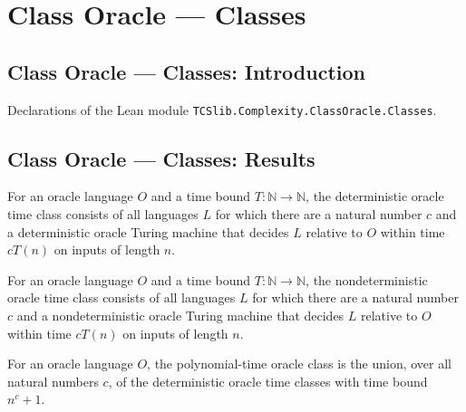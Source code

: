 \section{Class Oracle --- Classes}
\subsection*{Class Oracle --- Classes: Introduction}

Declarations of the Lean module \texttt{TCSlib.Complexity.ClassOracle.Classes}.

\subsection*{Class Oracle --- Classes: Results}

\begin{definition}
\label{Complexity.DTIMEOracle}
\leanok
{}
For an oracle language $O$ and a time bound $T\colon\mathbb{N}\to\mathbb{N}$, the
deterministic oracle time class consists of all languages $L$ for which there are a
natural number $c$ and a deterministic oracle Turing machine that decides $L$ relative
to $O$ within time $cT(n)$ on inputs of length $n$.
\end{definition}

\begin{definition}
\label{Complexity.NTIMEOracle}
\leanok
{}
For an oracle language $O$ and a time bound $T\colon\mathbb{N}\to\mathbb{N}$, the
nondeterministic oracle time class consists of all languages $L$ for which there are a
natural number $c$ and a nondeterministic oracle Turing machine that decides $L$
relative to $O$ within time $cT(n)$ on inputs of length $n$.
\end{definition}

\begin{definition}
\label{Complexity.POracle}
\leanok
{}
For an oracle language $O$, the polynomial-time oracle class is the union, over all
natural numbers $c$, of the deterministic oracle time classes with time bound $n^c+1$.
\end{definition}

